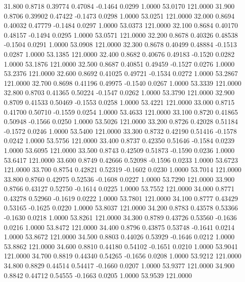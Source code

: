   31.800   0.8718   0.39774   0.47084  -0.1464   0.0299   1.0000  53.0170 121.0000
  31.900   0.8706   0.39902   0.47422  -0.1473   0.0298   1.0000  53.0251 121.0000
  32.000   0.8694   0.40032   0.47779  -0.1484   0.0297   1.0000  53.0373 121.0000
  32.100   0.8684   0.40170   0.48157  -0.1494   0.0295   1.0000  53.0571 121.0000
  32.200   0.8678   0.40326   0.48538  -0.1504   0.0291   1.0000  53.0908 121.0000
  32.300   0.8678   0.40499   0.48884  -0.1513   0.0287   1.0000  53.1385 121.0000
  32.400   0.8682   0.40676   0.49183  -0.1520   0.0282   1.0000  53.1876 121.0000
  32.500   0.8687   0.40851   0.49459  -0.1527   0.0276   1.0000  53.2376 121.0000
  32.600   0.8692   0.41025   0.49721  -0.1534   0.0272   1.0000  53.2867 121.0000
  32.700   0.8698   0.41196   0.49975  -0.1540   0.0267   1.0000  53.3339 121.0000
  32.800   0.8703   0.41365   0.50224  -0.1547   0.0262   1.0000  53.3790 121.0000
  32.900   0.8709   0.41533   0.50469  -0.1553   0.0258   1.0000  53.4221 121.0000
  33.000   0.8715   0.41700   0.50710  -0.1559   0.0254   1.0000  53.4633 121.0000
  33.100   0.8720   0.41865   0.50948  -0.1566   0.0250   1.0000  53.5026 121.0000
  33.200   0.8726   0.42028   0.51184  -0.1572   0.0246   1.0000  53.5400 121.0000
  33.300   0.8732   0.42190   0.51416  -0.1578   0.0242   1.0000  53.5756 121.0000
  33.400   0.8737   0.42350   0.51646  -0.1584   0.0239   1.0000  53.6095 121.0000
  33.500   0.8743   0.42509   0.51873  -0.1590   0.0236   1.0000  53.6417 121.0000
  33.600   0.8749   0.42666   0.52098  -0.1596   0.0233   1.0000  53.6723 121.0000
  33.700   0.8754   0.42821   0.52319  -0.1602   0.0230   1.0000  53.7014 121.0000
  33.800   0.8760   0.42975   0.52536  -0.1608   0.0227   1.0000  53.7290 121.0000
  33.900   0.8766   0.43127   0.52750  -0.1614   0.0225   1.0000  53.7552 121.0000
  34.000   0.8771   0.43278   0.52960  -0.1619   0.0222   1.0000  53.7801 121.0000
  34.100   0.8777   0.43429   0.53165  -0.1625   0.0220   1.0000  53.8037 121.0000
  34.200   0.8783   0.43578   0.53366  -0.1630   0.0218   1.0000  53.8261 121.0000
  34.300   0.8789   0.43726   0.53560  -0.1636   0.0216   1.0000  53.8472 121.0000
  34.400   0.8796   0.43875   0.53748  -0.1641   0.0214   1.0000  53.8672 121.0000
  34.500   0.8803   0.44026   0.53929  -0.1646   0.0212   1.0000  53.8862 121.0000
  34.600   0.8810   0.44180   0.54102  -0.1651   0.0210   1.0000  53.9041 121.0000
  34.700   0.8819   0.44340   0.54265  -0.1656   0.0208   1.0000  53.9212 121.0000
  34.800   0.8829   0.44514   0.54417  -0.1660   0.0207   1.0000  53.9377 121.0000
  34.900   0.8842   0.44712   0.54555  -0.1663   0.0205   1.0000  53.9539 121.0000
